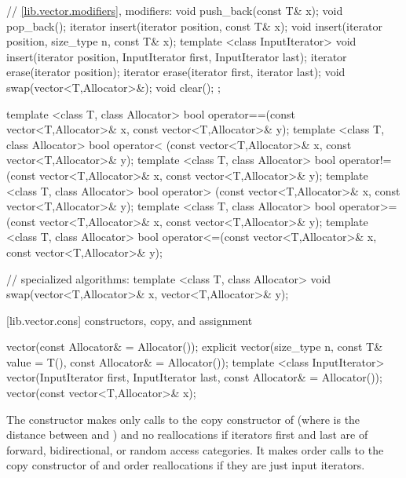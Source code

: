 \begin{codeblock}
{{    // \ref{lib.vector.modifiers}, modifiers:
    void push_back(const T& x);
    void pop_back();
    iterator insert(iterator position, const T& x);
    void     insert(iterator position, size_type n, const T& x);
    template <class InputIterator>
        void insert(iterator position,
                    InputIterator first, InputIterator last);
    iterator erase(iterator position);
    iterator erase(iterator first, iterator last);
    void     swap(vector<T,Allocator>&);
    void     clear();
  };

  template <class T, class Allocator>
    bool operator==(const vector<T,Allocator>& x,
                    const vector<T,Allocator>& y);
  template <class T, class Allocator>
    bool operator< (const vector<T,Allocator>& x,
                    const vector<T,Allocator>& y);
  template <class T, class Allocator>
    bool operator!=(const vector<T,Allocator>& x,
                    const vector<T,Allocator>& y);
  template <class T, class Allocator>
    bool operator> (const vector<T,Allocator>& x,
                    const vector<T,Allocator>& y);
  template <class T, class Allocator>
    bool operator>=(const vector<T,Allocator>& x,
                    const vector<T,Allocator>& y);
  template <class T, class Allocator>
    bool operator<=(const vector<T,Allocator>& x,
                    const vector<T,Allocator>& y);

  // specialized algorithms:
  template <class T, class Allocator>
    void swap(vector<T,Allocator>& x, vector<T,Allocator>& y);
}
\end{codeblock}%
%

[lib.vector.cons]{ constructors, copy, and assignment}

\begin{itemdecl}
vector(const Allocator& = Allocator());
explicit vector(size_type n, const T& value = T(),
                const Allocator& = Allocator());
template <class InputIterator>
  vector(InputIterator first, InputIterator last,
         const Allocator& = Allocator());
vector(const vector<T,Allocator>& x);
\end{itemdecl}

\begin{itemdescr}
\pnum
\complexity
The constructor 
makes only 
calls to the copy constructor of
(where 
is the distance between
and
)
and no reallocations if iterators first and last are of forward, bidirectional, or random access categories.
It makes order
calls to the copy constructor of
and order
reallocations if they are just input iterators.
\end{itemdescr}

